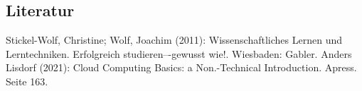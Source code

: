 

%
% 

\thispagestyle{empty}
\subsection{Literatur}
\renewcommand{\refname}{} %
\begin{thebibliography}{SW11} %
   Stickel-Wolf, Christine; Wolf, Joachim (2011): Wissenschaftliches Lernen und Lerntechniken. Erfolgreich studieren–-gewusst wie!. Wiesbaden: Gabler.
   Anders Lisdorf (2021): Cloud Computing Basics: a Non.-Technical Introduction. Apress. Seite 163.

\end{thebibliography}

